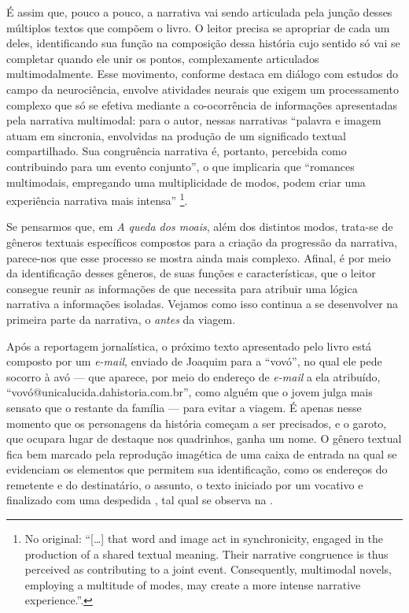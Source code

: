 \documentclass[portuguese]{textolivre}
\begin{document}
É assim que, pouco a pouco, a narrativa vai sendo articulada pela junção desses
múltiplos textos que compõem o livro. O leitor precisa se apropriar de cada um
deles, identificando sua função na composição dessa história cujo sentido só
vai se completar quando ele unir os pontos, complexamente articulados
multimodalmente. Esse movimento, conforme destaca \textcite{gibbons_i_2010} em
diálogo com estudos do campo da neurociência, envolve atividades neurais que
exigem um processamento complexo que só se efetiva mediante a co-ocorrência de
informações apresentadas pela narrativa multimodal: para o autor, nessas
narrativas “palavra e imagem atuam em sincronia, envolvidas na produção de um
significado textual compartilhado. Sua congruência narrativa é, portanto,
percebida como contribuindo para um evento conjunto”, o que implicaria que
“romances multimodais, empregando uma multiplicidade de modos, podem criar uma
experiência narrativa mais intensa” \cite[p.~101]{gibbons_i_2010}\footnote{No
original: “[…] that word and image act in synchronicity, engaged in the
production of a shared textual meaning. Their narrative congruence is thus
perceived as contributing to a joint event. Consequently, multimodal novels,
employing a multitude of modes, may create a more intense narrative
experience.”.}.

Se pensarmos que, em \textit{A queda dos moais}, além dos distintos modos,
trata-se de gêneros textuais específicos compostos para a criação da progressão
da narrativa, parece-nos que esse processo se mostra ainda mais complexo.
Afinal, é por meio da identificação desses gêneros, de suas funções e
características, que o leitor consegue reunir as informações de que necessita
para atribuir uma lógica narrativa a informações isoladas. Vejamos como isso
continua a se desenvolver na primeira parte da narrativa, o \textit{antes} da
viagem.

Após a reportagem jornalística, o próximo texto apresentado pelo livro está
composto por um \textit{e-mail}, enviado de Joaquim para a “vovó”, no qual ele
pede socorro à avó — que aparece, por meio do endereço de \textit{e-mail} a ela
atribuído, “vovó@unicalucida.dahistoria.com.br”, como alguém que o jovem julga
mais sensato que o restante da família — para evitar a viagem. É apenas nesse
momento que os personagens da história começam a ser precisados, e o garoto,
que ocupara lugar de destaque nos quadrinhos, ganha um nome. O gênero textual
fica bem marcado pela reprodução imagética de uma caixa de entrada na qual se
evidenciam os elementos que permitem sua identificação, como os endereços do
remetente e do destinatário, o assunto, o texto iniciado por um vocativo e
finalizado com uma despedida \cite[p.~110-112]{costa_dicionario_2012}, tal qual
se observa na .
\end{document}

